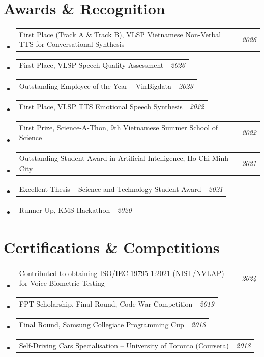 \documentclass[10pt,a4paper]{article}
\makeatletter
\newcommand{\cvline}[2]{%
  \noindent
  \begin{tabular*}{\linewidth}{@{}l@{\extracolsep{\fill}}r@{}}
    #1 & \textit{\small #2}
  \end{tabular*}%
}
\makeatother
\begin{document}
\section{Awards \& Recognition}

\begin{itemize}
  \item \cvline{First Place (Track A \& Track B), VLSP Vietnamese Non-Verbal TTS for Conversational Synthesis}{2026}
  \item \cvline{First Place, VLSP Speech Quality Assessment}{2026}
  \item \cvline{Outstanding Employee of the Year -- VinBigdata}{2023}
  \item \cvline{First Place, VLSP TTS Emotional Speech Synthesis}{2022}
  \item \cvline{First Prize, Science-A-Thon, 9th Vietnamese Summer School of Science}{2022}
  \item \cvline{Outstanding Student Award in Artificial Intelligence, Ho Chi Minh City}{2021}
  \item \cvline{Excellent Thesis -- Science and Technology Student Award}{2021}
  \item \cvline{Runner-Up, KMS Hackathon}{2020}
\end{itemize}

\section{Certifications \& Competitions}

\begin{itemize}
  \item \cvline{Contributed to obtaining ISO/IEC 19795-1:2021 (NIST/NVLAP) for Voice Biometric Testing}{2024}
  \item \cvline{FPT Scholarship, Final Round, Code War Competition}{2019}
  \item \cvline{Final Round, Samsung Collegiate Programming Cup}{2018}
  \item \cvline{Self-Driving Cars Specialisation -- University of Toronto (Coursera)}{2018}
\end{itemize}
\end{document}
